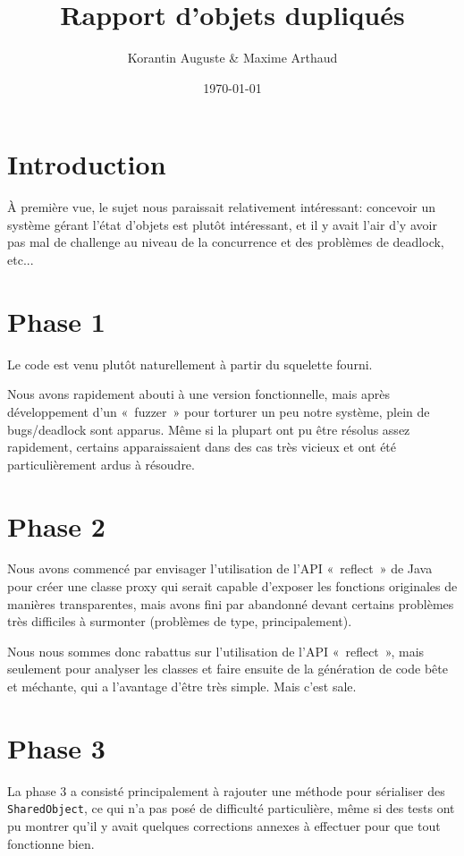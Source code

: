 \documentclass[11pt,a4paper]{article}
\title{Rapport d'objets dupliqués}
\author{Korantin Auguste \& Maxime Arthaud}
\date{\today}
\begin{document}
\maketitle

\section{Introduction}

À première vue, le sujet nous paraissait relativement intéressant: concevoir un système gérant l'état d'objets est plutôt intéressant,
et il y avait l'air d'y avoir pas mal de challenge au niveau de la concurrence et des problèmes de deadlock, etc...

\section{Phase 1}

Le code est venu plutôt naturellement à partir du squelette fourni.

Nous avons rapidement abouti à une version fonctionnelle, mais après développement d'un «~fuzzer~» pour torturer un peu notre système,
plein de bugs/deadlock sont apparus.
Même si la plupart ont pu être résolus assez rapidement, certains apparaissaient dans des
cas très vicieux et ont été particulièrement ardus à résoudre.

\section{Phase 2}

Nous avons commencé par envisager l'utilisation de l'API «~reflect~» de Java pour créer une classe proxy qui serait capable d'exposer
les fonctions originales de manières transparentes, mais avons fini par abandonné devant certains problèmes très difficiles à surmonter
(problèmes de type, principalement).

Nous nous sommes donc rabattus sur l'utilisation de l'API «~reflect~», mais seulement pour analyser les classes et faire ensuite de la génération de code bête et méchante, qui a l'avantage d'être très simple. Mais c'est sale.

\section{Phase 3}

La phase 3 a consisté principalement à rajouter une méthode pour sérialiser des \verb+SharedObject+, ce qui n'a pas posé de difficulté
particulière, même si des tests ont pu montrer qu'il y avait quelques corrections annexes à effectuer pour que tout fonctionne bien.
\end{document}
